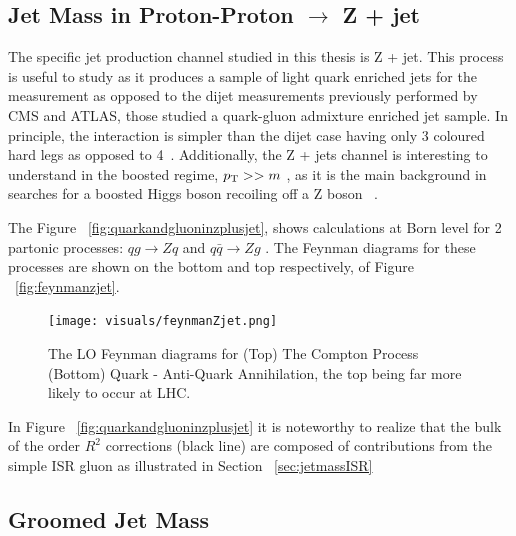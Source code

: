 




\subsection{Jet Mass in Proton-Proton $\rightarrow$ Z + jet }\label{sec:jetmass}

The specific jet production channel studied in this thesis is Z + jet. This process is useful to study as it produces a sample of light quark enriched jets for the measurement as opposed to the dijet measurements previously performed by CMS and ATLAS, those studied a quark-gluon admixture enriched jet sample. In principle, the interaction is simpler than the dijet case having only 3 coloured hard legs as opposed to 4~\cite{Marzani:2019hun}. Additionally, the Z + jets channel is interesting to understand in the boosted regime, $p_{\mathrm{T}} >> m$ , as it is the main background in searches for a boosted Higgs boson recoiling off a Z boson ~\cite{Marzani:2019hun}.





The Figure ~\ref{fig:quarkandgluoninzplusjet}, shows calculations at Born level for 2 partonic processes: $q g \rightarrow Z q$ and $q \bar{q} \rightarrow Z g $ . The Feynman diagrams for these processes are shown on the bottom and top respectively, of Figure ~\ref{fig:feynmanzjet}.

\begin{figure}[htb]
\centering
\texttt{[image: visuals/feynmanZjet.png]}
\caption{The LO Feynman diagrams for (Top) The Compton Process (Bottom) Quark - Anti-Quark Annihilation, the top being far more likely to occur at LHC. }
\label{fig:feynmanZjet}
\end{figure}


In Figure ~\ref{fig:quarkandgluoninzplusjet} it is noteworthy to realize that the bulk of the order $R^2$ corrections (black line) are composed of contributions from the simple ISR gluon as illustrated in Section ~\ref{sec:jetmassISR}



\subsection{Groomed Jet Mass }\label{sec:jetmassgroomed}

